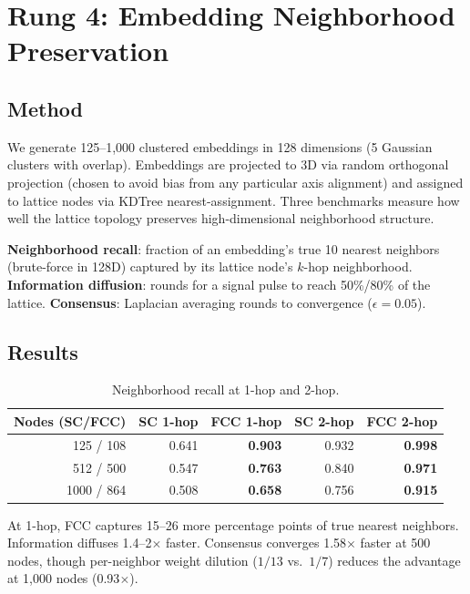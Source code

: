 \documentclass[11pt]{article}
\begin{document}
\section{Rung 4: Embedding Neighborhood Preservation}
\label{sec:embed}

\subsection{Method}

We generate 125--1{,}000 clustered embeddings in 128 dimensions
(5 Gaussian clusters with overlap). Embeddings are projected to 3D
via random orthogonal projection (chosen to avoid bias from any
particular axis alignment) and assigned to lattice nodes via
KDTree nearest-assignment. Three benchmarks measure how well the
lattice topology preserves high-dimensional neighborhood structure.

\textbf{Neighborhood recall}: fraction of an embedding's true 10
nearest neighbors (brute-force in 128D) captured by its lattice
node's $k$-hop neighborhood. \textbf{Information diffusion}: rounds
for a signal pulse to reach 50\%/80\% of the lattice.
\textbf{Consensus}: Laplacian averaging rounds to convergence
($\epsilon = 0.05$).

\subsection{Results}

\begin{table}[H]
\centering
\caption{Neighborhood recall at 1-hop and 2-hop.}
\label{tab:recall}
\begin{tabular}{rrrrr}
\toprule
Nodes (SC/FCC) & SC 1-hop & FCC 1-hop & SC 2-hop & FCC 2-hop \\
\midrule
125 / 108   & 0.641 & \textbf{0.903} & 0.932 & \textbf{0.998} \\
512 / 500   & 0.547 & \textbf{0.763} & 0.840 & \textbf{0.971} \\
1000 / 864  & 0.508 & \textbf{0.658} & 0.756 & \textbf{0.915} \\
\bottomrule
\end{tabular}
\end{table}

At 1-hop, FCC captures 15--26 more percentage points of true
nearest neighbors. Information diffuses 1.4--2$\times$ faster.
Consensus converges 1.58$\times$ faster at 500 nodes, though
per-neighbor weight dilution ($1/13$ vs.\ $1/7$) reduces the
advantage at 1{,}000 nodes (0.93$\times$).
\end{document}
